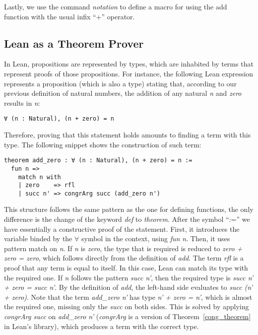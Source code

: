 Lastly, we use the command \textit{notation} to define a macro for using the add function with the usual infix ``+'' operator.



\subsection{Lean as a Theorem Prover}

In Lean, propositions are represented by types, which are inhabited by terms that represent proofs of those propositions. For instance, the following Lean expression represents a proposition (which is also a type) stating that, according to our previous definition of natural numbers, the addition of any natural \textit{n} and \textit{zero} results in \textit{n}:

\begin{verbatim}
∀ (n : Natural), (n + zero) = n
\end{verbatim}

Therefore, proving that this statement holds amounts to finding a term with this type. The following snippet shows the construction of such term:

\begin{verbatim}
theorem add_zero : ∀ (n : Natural), (n + zero) = n :=
  fun n =>
    match n with
    | zero    => rfl
    | succ n' => congrArg succ (add_zero n')
\end{verbatim}

This structure follows the same pattern as the one for defining functions, the only difference is the change of the keyword \textit{def} to \textit{theorem}. After the symbol ``:='' we have essentially a constructive proof of the statement. First, it introduces the variable binded by the $\forall$ symbol in the context, using \textit{fun n}. Then, it uses pattern match on \textit{n}. If \textit{n} is \textit{zero}, the type that is required is reduced to \textit{zero + zero = zero}, which follows directly from the definition of \textit{add}. The term \textit{rfl} is a proof that any term is equal to itself. In this case, Lean can match its type with the required one. If \textit{n} follows the pattern \textit{succ n'}, then the required type is \textit{succ n' + zero = succ n'}. By the definition of \textit{add}, the left-hand side evaluates to \textit{succ (n' + zero)}.
Note that the term \textit{add\_zero n'} has type \textit{n' + zero = n'}, which is almost the required one, missing only the \textit{succ} on both sides. This is solved by applying \textit{congrArg succ} on \textit{add\_zero n'} (\textit{congrArg} is a version of Theorem~\ref{cong_theorem} in Lean's library), which produces a term with the correct type.


